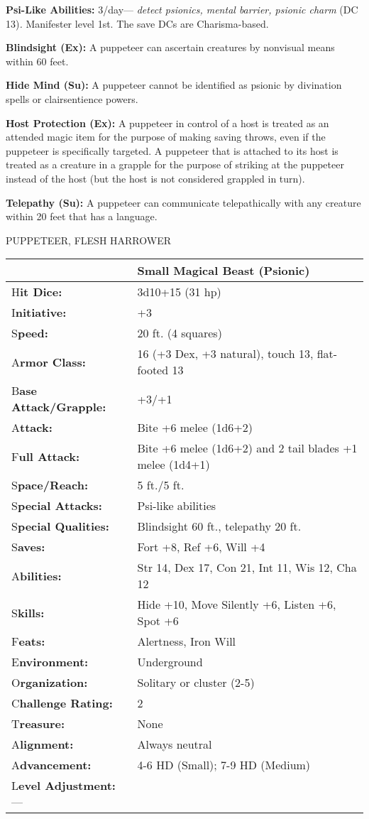\documentclass{article}
\begin{document}
\textbf{Psi-Like Abilities:} 3/day--- \textit{detect psionics, mental barrier, 
psionic charm }(DC 13)\textit{. }Manifester level 1st. The save DCs are Charisma-based.

\textbf{Blindsight (Ex):} A puppeteer can ascertain creatures by nonvisual means 
within 60 feet.

\textbf{Hide Mind (Su):} A puppeteer cannot be identified as psionic by divination 
spells or clairsentience powers.

\textbf{Host Protection (Ex):} A puppeteer in control of a host is treated as an 
attended magic item for the purpose of making saving throws, even if the puppeteer 
is specifically targeted. A puppeteer that is attached to its host is treated as 
a creature in a grapple for the purpose of striking at the puppeteer instead of 
the host (but the host is not considered grappled in turn).

\textbf{Telepathy (Su):} A puppeteer can communicate telepathically with any creature 
within 20 feet that has a language.

\vspace{12pt}
{\LARGE{}PUPPETEER, FLESH HARROWER}

\begin{tabular}{|>{\raggedright}p{91pt}|>{\raggedright}p{231pt}|}
\hline
  & Small Magical Beast (Psionic)\tabularnewline
\hline
H\textbf{it Dice:} & 3d10+15 (31 hp)\tabularnewline
\hline
I\textbf{nitiative:} & +3\tabularnewline
\hline
S\textbf{peed:} & 20 ft. (4 squares)\tabularnewline
\hline
A\textbf{rmor Class:} & 16 (+3 Dex, +3 natural), touch 13, flat-footed 13\tabularnewline
\hline
B\textbf{ase Attack/Grapple:} & +3/+1\tabularnewline
\hline
A\textbf{ttack:} & Bite +6 melee (1d6+2)\tabularnewline
\hline
F\textbf{ull Attack:} & Bite +6 melee (1d6+2) and 2 tail blades +1 melee (1d4+1)\tabularnewline
\hline
S\textbf{pace/Reach:} & 5 ft./5 ft.\tabularnewline
\hline
S\textbf{pecial Attacks:} & Psi-like abilities\tabularnewline
\hline
S\textbf{pecial Qualities:} & Blindsight 60 ft., telepathy 20 ft.\tabularnewline
\hline
S\textbf{aves:} & Fort +8, Ref +6, Will +4\tabularnewline
\hline
A\textbf{bilities:} & Str 14, Dex 17, Con 21, Int 11, Wis 12, Cha 12\tabularnewline
\hline
S\textbf{kills:} & Hide +10, Move Silently +6, Listen +6, Spot +6\tabularnewline
\hline
F\textbf{eats:} & Alertness, Iron Will\tabularnewline
\hline
E\textbf{nvironment:} & Underground\tabularnewline
\hline
O\textbf{rganization:} & Solitary or cluster (2-5)\tabularnewline
\hline
C\textbf{hallenge Rating:} & 2\tabularnewline
\hline
T\textbf{reasure:} & None\tabularnewline
\hline
A\textbf{lignment:} & Always neutral\tabularnewline
\hline
A\textbf{dvancement:} & 4-6 HD (Small); 7-9 HD (Medium)\tabularnewline
\hline
L\textbf{evel Adjustment:}--- & \tabularnewline
\hline
\end{tabular}
\end{document}
